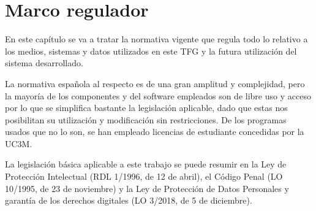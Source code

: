 \chapter{Marco regulador}\label{ch:marco}
En este capítulo se va a tratar la normativa vigente que regula todo lo relativo a los medios, sistemas y datos utilizados en este TFG y la futura utilización del sistema desarrollado.

La normativa española al respecto es de una gran amplitud y complejidad, pero la mayoría de los componentes y del software empleados son de libre uso y acceso por lo que se simplifica bastante la legislación aplicable, dado que estas nos posibilitan su utilización y modificación sin restricciones. De los programas usados que no lo son, se han empleado licencias de estudiante concedidas por la UC3M\@.

La legislación básica aplicable a este trabajo se puede resumir en la Ley de Protección Intelectual (RDL 1/1996, de 12 de abril), el Código Penal (LO 10/1995, de 23 de noviembre) y la Ley de Protección de Datos Personales y garantía de los derechos digitales (LO 3/2018, de 5 de diciembre).

